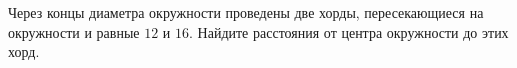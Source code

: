 \begin{ex}
	\begin{condition}
		Через концы диаметра окружности проведены две хорды, пересекающиеся на окружности и равные \( 12  \) и \( 16  \). Найдите расстояния от центра окружности до этих хорд.
	\end{condition}
\end{ex}